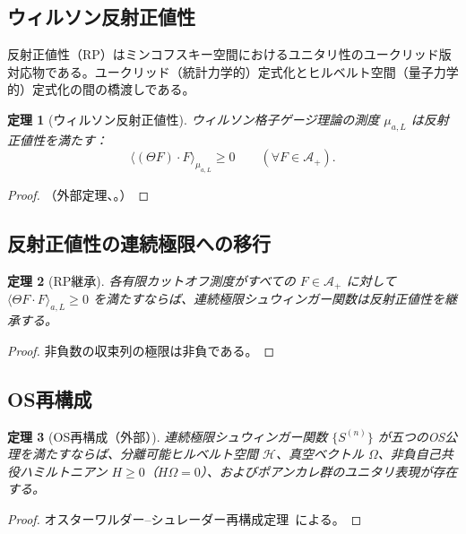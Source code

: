 \documentclass[12pt]{article}
\theoremstyle{plain}
\newtheorem{theorem}{定理}[section]
\theoremstyle{definition}
\numberwithin{equation}{section}
\begin{document}
\subsection{ウィルソン反射正値性}

反射正値性（RP）はミンコフスキー空間におけるユニタリ性のユークリッド版対応物である。ユークリッド（統計力学的）定式化とヒルベルト空間（量子力学的）定式化の間の橋渡しである。

\begin{theorem}[ウィルソン反射正値性]\label{thm:WilsonRP}
ウィルソン格子ゲージ理論の測度 $\mu_{a,L}$ は反射正値性を満たす：
\begin{equation}
\langle(\Theta F)\cdot F\rangle_{\mu_{a,L}} \geq 0\qquad(\forall F\in\mathcal{A}_+).
\end{equation}
\end{theorem}

\begin{proof}
（外部定理、\cite{WilsonRP}。）
\end{proof}

\subsection{反射正値性の連続極限への移行}

\begin{theorem}[RP継承]\label{thm:RPlimit}
各有限カットオフ測度がすべての $F\in\mathcal{A}_+$ に対して $\langle\Theta F\cdot F\rangle_{a,L}\geq 0$ を満たすならば、連続極限シュウィンガー関数は反射正値性を継承する。
\end{theorem}

\begin{proof}
非負数の収束列の極限は非負である。
\end{proof}

\subsection{OS再構成}

\begin{theorem}[OS再構成（外部）]\label{thm:OS}
連続極限シュウィンガー関数 $\{S^{(n)}\}$ が五つのOS公理を満たすならば、分離可能ヒルベルト空間 $\mathcal{H}$、真空ベクトル $\Omega$、非負自己共役ハミルトニアン $H\geq 0$（$H\Omega=0$）、およびポアンカレ群のユニタリ表現が存在する。
\end{theorem}

\begin{proof}
オスターワルダー--シュレーダー再構成定理~\cite{OsterwalderSchrader}による。
\end{proof}
\end{document}
